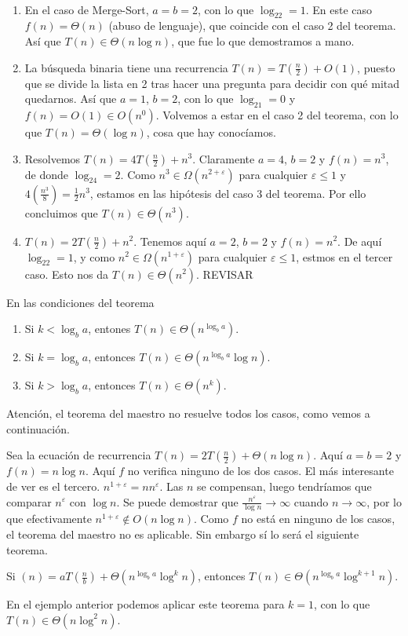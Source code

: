\documentclass[AL.tex]{subfiles}
\begin{document}
\begin{ejs}\
\begin{enumerate}
\item En el caso de Merge-Sort, $a=b=2$, con lo que $\log_22=1$. En este caso $f(n)=\Theta(n)$ (abuso de lenguaje), que coincide con el caso 2 del teorema. Así que $T(n)\in\Theta(n\log n)$, que fue lo que demostramos a mano. 

\item La búsqueda binaria tiene una recurrencia $T(n)=T(\frac{n}{2})+O(1)$, puesto que se divide la lista en 2 tras hacer una pregunta para decidir con qué mitad quedarnos. Así que $a=1$, $b=2$, con lo que $\log_21=0$ y $f(n)=O(1)\in O(n^0)$. Volvemos a estar en el caso 2 del teorema, con lo que $T(n)=\Theta(\log n)$, cosa que hay conocíamos. 

\item Resolvemos $T(n)=4T(\frac{n}{2})+n^3$. Claramente $a=4$, $b=2$ y $f(n)=n^3$, de donde $\log_24=2$. Como $n^3\in\Omega (n^{2+\varepsilon})$ para cualquier $\varepsilon\leq 1$ y $4(\frac{n^3}{8})=\frac{1}{2}n^3$, estamos en las hipótesis del caso 3 del teorema. Por ello concluimos que $T(n)\in\Theta(n^3)$. 

\item $T(n)=2T(\frac{n}{2})+n^2$. Tenemos aquí $a=2$, $b=2$ y $f(n)=n^2$. De aquí $\log_22=1$, y como $n^2\in\Omega(n^{1+\varepsilon})$ para cualquier $\varepsilon\leq 1$, estmos en el tercer caso. Esto nos da $T(n)\in\Theta(n^2)$. REVISAR 
\end{enumerate}
\end{ejs}

\begin{coro}[versión para $f(n)=\Theta(n^k)$]
En las condiciones del teorema
\begin{enumerate}
\item Si $k<\log_ba$, entones $T(n)\in\Theta(n^{\log_ba})$.
\item Si $k=\log_ba$, entonces $T(n)\in\Theta(n^{\log_ba}\log n)$.
\item Si $k>\log_ba$, entonces $T(n)\in\Theta(n^k)$. 
\end{enumerate}
\end{coro}

Atención, el teorema del maestro no resuelve todos los casos, como vemos a continuación.
\begin{ej}
Sea la ecuación de recurrencia $T(n)=2T(\frac{n}{2})+\Theta(n\log n)$. Aquí $a=b=2$ y $f(n)=n\log n$. Aquí $f$ no verifica ninguno de los dos casos. El más interesante de ver es el tercero. $n^{1+\varepsilon}=nn^{\varepsilon}$. Las $n$ se compensan, luego tendríamos que comparar $n^{\varepsilon}$ con $\log n$. Se puede demostrar que $\frac{n^{\varepsilon}}{\log n}\to\infty$ cuando $n\to\infty$, por lo que efectivamente $n^{1+\varepsilon}\notin O(n\log n)$. Como $f$ no está en ninguno de los casos, el teorema del maestro no es aplicable. Sin embargo sí lo será el siguiente teorema.
\end{ej}

\begin{teorema}
Si $(n)=aT(\frac{n}{b})+\Theta(n^{\log_ba}\log^kn)$, entonces $T(n)\in\Theta(n^{\log_ba}\log^{k+1}n)$.
\end{teorema}

En el ejemplo anterior podemos aplicar este teorema para $k=1$, con lo que $T(n)\in\Theta(n\log^2n)$. 
\end{document}
